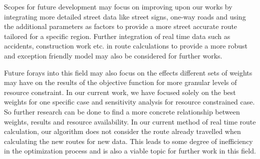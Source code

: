 \documentclass[12pt]{article}
\begin{document}
Scopes for future development may focus on improving upon our works by integrating more detailed street data like street signs, one-way roads and using the additional parameters as factors to provide a more street accurate route tailored for a specific region. Further integration of real time data such as accidents, construction work etc. in route calculations to provide a more robust and exception friendly model may also be considered for further works.

Future forays into this field may also focus on the effects different sets of weights may have on the results of the objective function for more granular levels of resource constraint. In our current work, we have focused solely on the best weights for one specific case and sensitivity analysis for resource constrained case. So further research can be done to find a more concrete relationship between weights, results and resource availability. In our current method of real time route calculation, our algorithm does not consider the route already travelled when calculating the new routes for new data. This leads to some degree of inefficiency in the optimization process and is also a viable topic for further work in this field.



\end{document}
